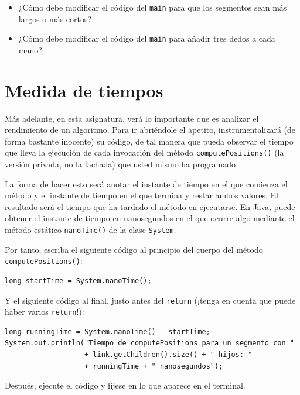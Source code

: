\documentclass[10pt,a4paper,spanish]{article}
\newcommand{\code}[1]{\texttt{#1}}
\begin{document}
\begin{itemize}
    \item ¿Cómo debe modificar el código del \code{main} para que los segmentos sean más largos o más cortos?
    \item ¿Cómo debe modificar el código del \code{main} para añadir tres dedos a cada mano?
\end{itemize}

\section{Medida de tiempos}

Más adelante, en esta asignatura, verá lo importante que es analizar el rendimiento de un algoritmo. Para ir abriéndole el apetito, instrumentalizará (de forma bastante inocente) su código, de tal manera que pueda observar el tiempo que lleva la ejecución de cada invocación del método \code{computePositions()} (la versión privada, no la fachada) que usted mismo ha programado.

La forma de hacer esto será anotar el instante de tiempo en el que comienza el método y el instante de tiempo en el que termina y restar ambos valores. El resultado será el tiempo que ha tardado el método en ejecutarse. En Java, puede obtener el instante de tiempo en nanosegundos en el que ocurre algo mediante el método estático \code{nanoTime()} de la clase \code{System}.

Por tanto, escriba el siguiente código al principio del cuerpo del método \code{computePositions()}:

\begin{verbatim}
long startTime = System.nanoTime();
\end{verbatim}

Y el siguiente código al final, justo antes del \code{return} (¡tenga en cuenta que puede haber varios \code{return}!):

\begin{verbatim}
long runningTime = System.nanoTime() - startTime;
System.out.println("Tiempo de computePositions para un segmento con "
                   + link.getChildren().size() + " hijos: "
                   + runningTime + " nanosegundos");
\end{verbatim}

Después, ejecute el código y fíjese en lo que aparece en el terminal.
\end{document}
